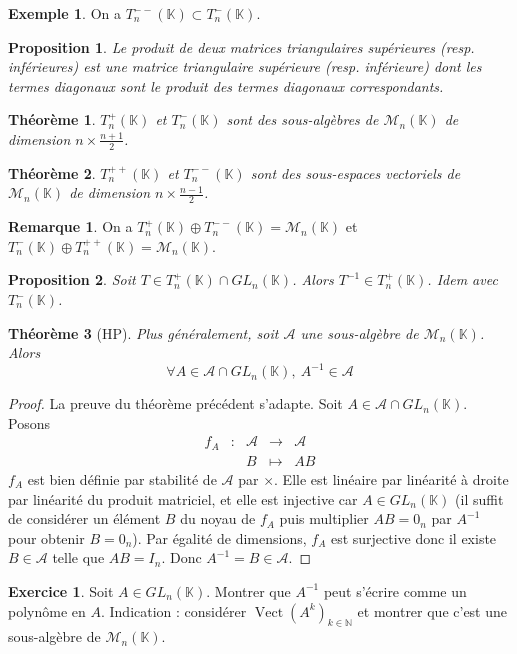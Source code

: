 \documentclass[french]{book}
\newcommand{\N}{\mathbb{N}}
\newcommand{\K}{\mathbb{K}}
\newcommand{\inv}{^{-1}}
\theoremstyle{plain}
\newtheorem{thm}{Théorème}[chapter]
\newtheorem{prop}{Proposition}[chapter]
\theoremstyle{definition}
\newtheorem{exa}{Exemple}[chapter]
\newtheorem{rmq}{Remarque}[chapter]
\newtheorem{exe}{Exercice}[chapter]
\theoremstyle{remark}
\DeclareMathOperator{\vect}{Vect}
\begin{document}
\begin{exa}
	On a $T_n^{--}(\K)\subset T_n^-(\K)$.
\end{exa}
\begin{prop}
	Le produit de deux matrices triangulaires supérieures (resp. inférieures) est une matrice triangulaire supérieure (resp. inférieure) dont les termes diagonaux sont le produit des termes diagonaux correspondants.
\end{prop}
\begin{thm}
	$T_n^+(\K)$ et $T_n^-(\K)$ sont des sous-algèbres de $\mathcal{M}_n(\K)$ de dimension $\displaystyle n\times\frac{n+1}{2}$.
\end{thm}
\begin{thm}
	$T_n^{++}(\K)$ et $T_n^{--}(\K)$ sont des sous-espaces vectoriels de $\mathcal{M}_n(\K)$ de dimension $\displaystyle n\times\frac{n-1}{2}$.
\end{thm}
\begin{rmq}
	On a $T_n^+(\K)\oplus T_n^{--}(\K)=\mathcal{M}_n(\K)$ et $T_n^-(\K)\oplus T_n^{++}(\K)=\mathcal{M}_n(\K)$.
\end{rmq}
\begin{prop}
	Soit $T\in T_n^+(\K)\cap GL_n(\K)$. Alors $T\inv\in T_n^+(\K)$. Idem avec $T_n^-(\K)$.
\end{prop}
\begin{thm}[HP]
	Plus généralement, soit $\mathcal{A}$ une sous-algèbre de $\mathcal{M}_n(\K)$. Alors $$\forall A\in\mathcal{A}\cap GL_n(\K),\ A\inv\in\mathcal{A}$$
\end{thm}
\begin{proof}
	La preuve du théorème précédent s'adapte. Soit $A\in\mathcal{A}\cap GL_n(\K)$. Posons $$\begin{array}{ccccc}f_A&:&\mathcal{A}&\rightarrow&\mathcal{A}\\&&B&\mapsto&AB\end{array}$$ $f_A$ est bien définie par stabilité de $\mathcal{A}$ par $\times$. Elle est linéaire par linéarité à droite par linéarité du produit matriciel, et elle est injective car $A\in GL_n(\K)$ (il suffit de considérer un élément $B$ du noyau de $f_A$ puis multiplier $AB=0_n$ par $A\inv$ pour obtenir $B=0_n$). Par égalité de dimensions, $f_A$ est surjective donc il existe $B\in\mathcal{A}$ telle que $AB=I_n$. Donc $A\inv=B\in\mathcal{A}$.
\end{proof}
\begin{exe}
	Soit $A\in GL_n(\K)$. Montrer que $A\inv$ peut s'écrire comme un polynôme en $A$. Indication : considérer $\vect(A^k)_{k\in\N}$ et montrer que c'est une sous-algèbre de $\mathcal{M}_n(\K)$.
\end{exe}
\end{document}
